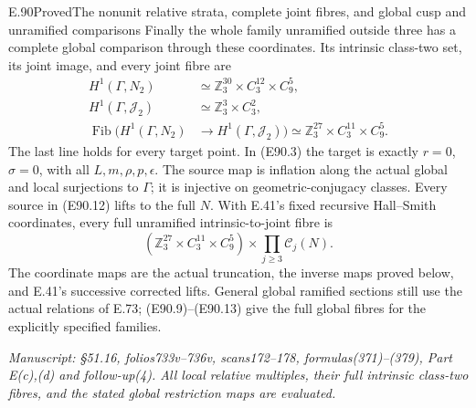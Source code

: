 \begin{statement}{E.90}{Proved}{The nonunit relative strata, complete joint fibres, and global cusp and unramified comparisons}
Finally the whole family unramified outside three
has a complete global comparison through these
coordinates. Its intrinsic class-two set, its
joint image, and every joint fibre are
\[
\begin{aligned}
 H^1(\Gamma,N_2)&\simeq
       \mathbb Z_3^{30}\times C_3^{12}\times C_9^5,\\
 H^1(\Gamma,\mathcal J_2)&\simeq
       \mathbb Z_3^3\times C_3^2,\\
 \operatorname{Fib}\bigl(H^1(\Gamma,N_2)&\longrightarrow
                  H^1(\Gamma,\mathcal J_2)\bigr)
       \simeq\mathbb Z_3^{27}\times C_3^{11}\times C_9^5.
\end{aligned}
 \tag{E90.12}
\]
The last line holds for every target point.
In (E90.3) the target is exactly
$r=0$, $\sigma=0$, with all $L,m,\rho,p,\epsilon$.
The source map is inflation along the actual
global and local surjections to $\Gamma$; it is
injective on geometric-conjugacy classes.
Every source in (E90.12) lifts to the full $N$.
With E.41's fixed recursive Hall--Smith coordinates,
every full unramified intrinsic-to-joint fibre is
\[
 \left(\mathbb Z_3^{27}\times C_3^{11}\times C_9^5\right)
          \times\prod_{j\ge3}\mathcal C_j(N).
 \tag{E90.13}
\]
The coordinate maps are the actual truncation,
the inverse maps proved below, and E.41's
successive corrected lifts. General global
ramified sections still use the actual relations
of E.73; (E90.9)--(E90.13) give the full global
fibres for the explicitly specified families.

\emph{Manuscript: \S51.16, folios733v--736v,
scans172--178, formulas(371)--(379), Part E(c),(d)
and follow-up(4). All local relative multiples,
their full intrinsic class-two fibres, and the
stated global restriction maps are evaluated.}
\end{statement}

